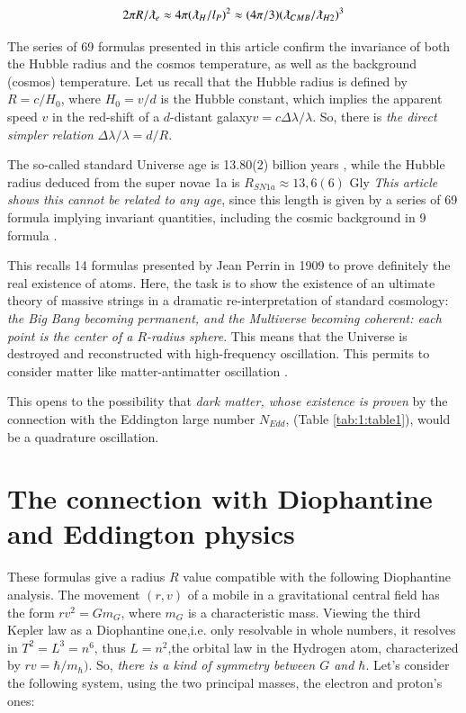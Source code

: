 \documentclass[a4paper,9pt]{article}
\begin{document}
    \begin{equation}
        2\pi R/\lambdabar_e \approx 4\pi (\lambdabar_H/l_P)^2 \approx (4\pi/3) (\lambdabar_{CMB}/\lambdabar_{H2})^3
    \end{equation}

    The series of 69 formulas presented in this article confirm the invariance of both the Hubble radius and the cosmos temperature, as well as the background (cosmos) temperature. Let us recall that the Hubble radius is defined by $R = c/H_0$, where $H_0 = v/d$ is the Hubble constant, which implies the apparent speed $v$ in the red-shift of a $d$-distant galaxy$ v = c \Delta \lambda/\lambda$. So, there is \textit {the direct simpler relation} $\Delta \lambda/\lambda =  d/R$. 
    

    
    The so-called standard Universe age is 13.80(2) billion years \cite{Tanabashi}, while the Hubble radius deduced from the super novae 1a is $R_{SN1a} \approx 13,6(6)$ Gly \cite{Freeman}\textit{This article shows this cannot be related to any age}, since this length is given by a series of 69 formula implying invariant quantities, including the cosmic background in 9 formula . 
    
    
    This recalls 14 formulas presented by Jean Perrin in 1909 to prove definitely the real existence of atoms. Here, the task is to show the existence of an ultimate theory of massive strings in a dramatic re-interpretation of standard cosmology:\textit{ the Big Bang becoming permanent, and the Multiverse becoming coherent: each point is the center of a $R$-radius sphere}. This means that the Universe is destroyed and reconstructed with high-frequency oscillation. This permits to consider matter like matter-antimatter oscillation \cite{Sanchez2}. 
    
    This opens to the possibility that \textit {dark matter, whose existence is proven} by the connection with the Eddington large number $N_{Edd}$, (Table \ref{tab:1:table1}), would be a quadrature oscillation.









    \section{The connection with Diophantine and Eddington physics}

These formulas give a radius $R$ value compatible with the following Diophantine analysis. The movement $(r,v)$ of a mobile in a gravitational central field has the form $r v^2 = Gm_G$, where $m_G$ is a characteristic mass. Viewing the third Kepler law as a Diophantine one,i.e. only resolvable in whole numbers, it resolves in  $T^2 = L^3 = n^6$, thus $L = n^2$,the orbital law in the Hydrogen atom, characterized by $rv = \hbar/m_{\hbar})$. So, \textit{there is a kind of symmetry between $G$ and $\hbar$}. Let's consider the following system, using the two principal masses, the electron and proton's ones: 
\end{document}
